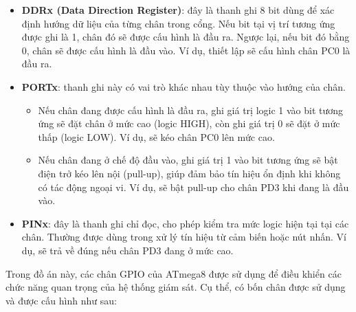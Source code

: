 \documentclass[../DoAn.tex]{subfiles}
\begin{document}
\begin{itemize}
    \item \textbf{DDRx (Data Direction Register)}: đây là thanh ghi 8 bit dùng để xác định hướng dữ liệu của từng chân trong cổng. Nếu bit tại vị trí tương ứng được ghi là 1, chân đó sẽ được cấu hình là đầu ra. Ngược lại, nếu bit đó bằng 0, chân sẽ được cấu hình là đầu vào. Ví dụ, thiết lập  sẽ cấu hình chân PC0 là đầu ra.
    
    \item \textbf{PORTx}: thanh ghi này có vai trò khác nhau tùy thuộc vào hướng của chân. 
    \begin{itemize}
        \item Nếu chân đang được cấu hình là đầu ra, ghi giá trị logic 1 vào bit tương ứng sẽ đặt chân ở mức cao (logic HIGH), còn ghi giá trị 0 sẽ đặt ở mức thấp (logic LOW). Ví dụ,  sẽ kéo chân PC0 lên mức cao.
        \item Nếu chân đang ở chế độ đầu vào, ghi giá trị 1 vào bit tương ứng sẽ bật điện trở kéo lên nội (pull-up), giúp đảm bảo tín hiệu ổn định khi không có tác động ngoại vi. Ví dụ,  sẽ bật pull-up cho chân PD3 khi đang là đầu vào.
    \end{itemize}

    \item \textbf{PINx}: đây là thanh ghi chỉ đọc, cho phép kiểm tra mức logic hiện tại tại các chân. Thường được dùng trong xử lý tín hiệu từ cảm biến hoặc nút nhấn. Ví dụ,  sẽ trả về đúng nếu chân PD3 đang ở mức cao.
\end{itemize}

Trong đồ án này, các chân GPIO của ATmega8 được sử dụng để điều khiển các chức năng quan trọng của hệ thống giám sát. Cụ thể, có bốn chân được sử dụng và được cấu hình như sau:
\end{document}

